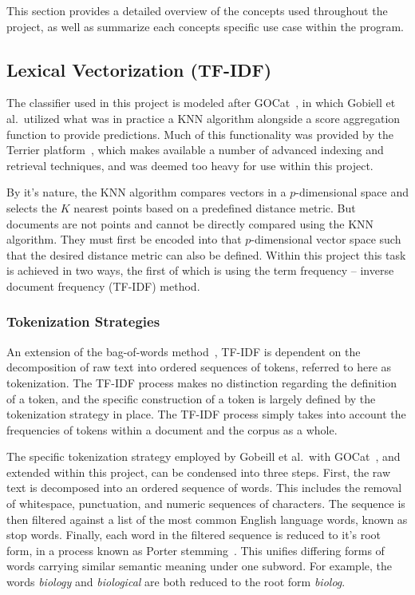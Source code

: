 \documentclass[11pt]{article}
\theoremstyle{plain}
\theoremstyle{definition}
\begin{document}
This section provides a detailed overview of the concepts used throughout the project, as well as summarize each concepts specific use case within the program.

\subsection{Lexical Vectorization (TF-IDF)}\label{sec:background-lexical}

The classifier used in this project is modeled after GOCat~\cite{gobeill/2013/managing}, in which Gobiell et al.\ utilized what was in practice a KNN algorithm alongside a score aggregation function to provide predictions. Much of this functionality was provided by the Terrier platform~\cite{ounis/2006/terrier}, which makes available a number of advanced indexing and retrieval techniques, and was deemed too heavy for use within this project.

By it's nature, the KNN algorithm compares vectors in a $p$-dimensional space and selects the $K$ nearest points based on a predefined distance metric. But documents are not points and cannot be directly compared using the KNN algorithm. They must first be encoded into that $p$-dimensional vector space such that the desired distance metric can also be defined. Within this project this task is achieved in two ways, the first of which is using the term frequency -- inverse document frequency (TF-IDF) method.

\subsubsection{Tokenization Strategies}\label{sec:background-lexical-tokenization}

An extension of the bag-of-words method~\cite{kim/2019/multicotraining}, TF-IDF  is dependent on the decomposition of raw text into ordered sequences of tokens, referred to here as tokenization. The TF-IDF process makes no distinction regarding the definition of a token, and the specific construction of a token is largely defined by the tokenization strategy in place. The TF-IDF process simply takes into account the frequencies of tokens within a document and the corpus as a whole.

The specific tokenization strategy employed by Gobeill et al.\ with GOCat~\cite{gobeill/2013/managing}, and extended within this project, can be condensed into three steps. First, the raw text is decomposed into an ordered sequence of words. This includes the removal of whitespace, punctuation, and numeric sequences of characters. The sequence is then filtered against a list of the most common English language words, known as stop words. Finally, each word in the filtered sequence is reduced to it's root form, in a process known as Porter stemming~\cite{porter/1980/algorithm}. This unifies differing forms of words carrying similar semantic meaning under one subword. For example, the words \textit{biology} and \textit{biological} are both reduced to the root form \textit{biolog}.
\end{document}
